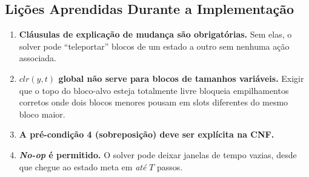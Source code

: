 \documentclass[12pt,a4paper]{article}
\begin{document}
\subsection{Lições Aprendidas Durante a Implementação}

\begin{enumerate}[leftmargin=1.2cm]
    \item \textbf{Cláusulas de explicação de mudança são obrigatórias.} Sem elas, o solver pode ``teleportar'' blocos de um estado a outro sem nenhuma ação associada.
    \item \textbf{$clr(y,t)$ global não serve para blocos de tamanhos variáveis.} Exigir que o topo do bloco-alvo esteja totalmente livre bloqueia empilhamentos corretos onde dois blocos menores pousam em slots diferentes do mesmo bloco maior.
    \item \textbf{A pré-condição 4 (sobreposição) deve ser explícita na CNF.}
    \item \textbf{\emph{No-op} é permitido.} O solver pode deixar janelas de tempo vazias, desde que chegue ao estado meta em \emph{até} $T$ passos.
\end{enumerate}
\end{document}
